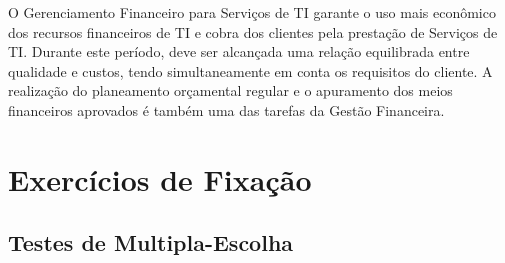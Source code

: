 \documentclass[
]{book}
\begin{document}
O Gerenciamento Financeiro para Serviços de TI garante o uso mais econômico dos recursos financeiros de TI e cobra dos clientes pela prestação de Serviços de TI. Durante este período, deve ser alcançada uma relação equilibrada entre qualidade e custos, tendo simultaneamente em conta os requisitos do cliente. A realização do planeamento orçamental regular e o apuramento dos meios financeiros aprovados é também uma das tarefas da Gestão Financeira.

\section{Exercícios de Fixação}\label{exercuxedcios-de-fixauxe7uxe3o}

\subsection{Testes de Multipla-Escolha}\label{testes-de-multipla-escolha}
\end{document}

